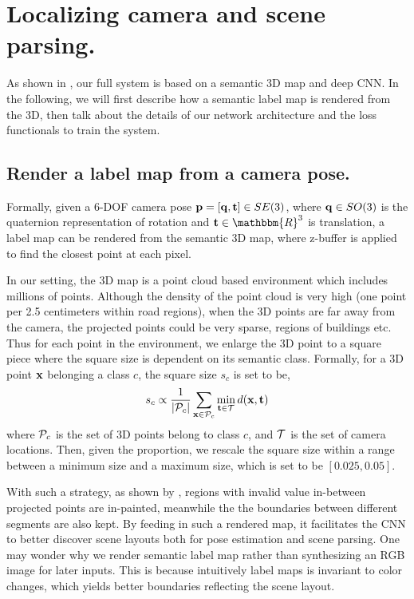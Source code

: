 \section{Localizing camera and scene parsing.}
\label{sec:localize_and_parsing}
As shown in , our full system is based on a semantic 3D map and deep CNN. In the following, we will first describe how a semantic label map is rendered from the 3D, then talk about the details of our network architecture and the loss functionals to train the system.

\subsection{Render a label map from a camera pose.}
\label{sub:render}
Formally, given a 6-DOF camera pose ${\mathbf p} = [{\mathbf q}, {\mathbf t}] \in SE(3)$, where ${\mathbf q} \in SO(3)$ is the quaternion representation of rotation and $\ve{t} \in \mathbbm{R}^3$ is translation, a label map can be rendered from the semantic 3D map, where z-buffer is applied to find the closest point at each pixel.

In our setting, the 3D map is a point cloud based environment which includes millions of points. Although the density of the point cloud is very high (one point per 2.5 centimeters within road regions), when the 3D points are far away from the camera, the projected points could be very sparse, \eg regions of buildings etc.
Thus for each point in the environment, we enlarge the 3D point to a square piece where the square size is dependent on its semantic class. Formally, for a 3D point ${\mathbf x}$ belonging a class $c$, the square size $s_c$ is set to be,
\begin{align}
\label{eq:square_size}
s_c \propto \frac{1}{|{\mathcal P}_c|}\sum_{{\mathbf x}\in {\mathcal P}_c} \min_{{\mathbf t}\in{\mathcal T}} d({\mathbf x}, {\mathbf t})
\end{align}
where ${\mathcal P}_c$ is the set of 3D points belong to class $c$, and ${\mathcal T}$ is the set of camera locations. Then, given the proportion, we rescale the square size within a range between a minimum size and a maximum size, which is set to be $[0.025, 0.05]$.

With such a strategy, as shown by , regions with invalid value in-between projected points are in-painted, meanwhile the the boundaries between different segments are also kept. By feeding in such a rendered map, it facilitates the CNN to better discover scene layouts both for pose estimation and scene parsing.
One may wonder why we render semantic label map rather than synthesizing an RGB image for later inputs.
This is because intuitively label maps is invariant to color changes, which yields better boundaries reflecting the scene layout.

